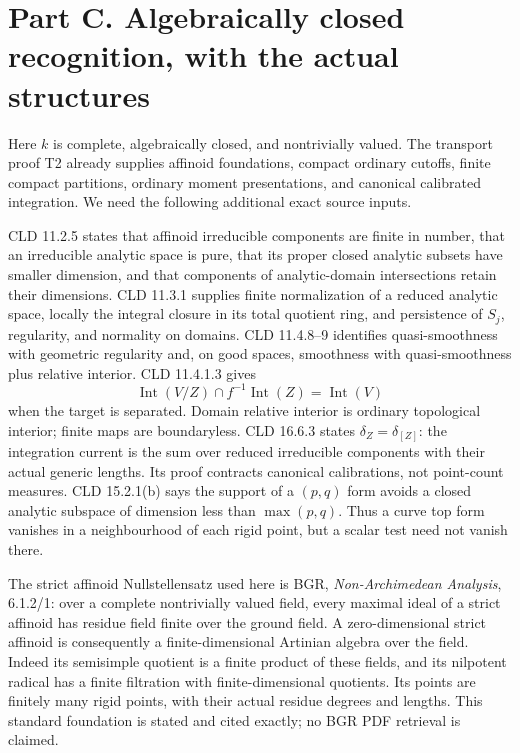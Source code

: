 \documentclass[
  10pt,
]{article}
\begin{document}
\section{Part C. Algebraically closed recognition, with the actual
structures}\label{part-c.-algebraically-closed-recognition-with-the-actual-structures}

Here \(k\) is complete, algebraically closed, and nontrivially valued.
The transport proof T2 already supplies affinoid foundations, compact
ordinary cutoffs, finite compact partitions, ordinary moment
presentations, and canonical calibrated integration. We need the
following additional exact source inputs.

CLD 11.2.5 states that affinoid irreducible components are finite in
number, that an irreducible analytic space is pure, that its proper
closed analytic subsets have smaller dimension, and that components of
analytic-domain intersections retain their dimensions. CLD 11.3.1
supplies finite normalization of a reduced analytic space, locally the
integral closure in its total quotient ring, and persistence of \(S_j\),
regularity, and normality on domains. CLD 11.4.8--9 identifies
quasi-smoothness with geometric regularity and, on good spaces,
smoothness with quasi-smoothness plus relative interior. CLD 11.4.1.3
gives \[
 \operatorname{Int}(V/Z)\cap f^{-1}\operatorname{Int}(Z)=\operatorname{Int}(V)
\] when the target is separated. Domain relative interior is ordinary
topological interior; finite maps are boundaryless. CLD 16.6.3 states
\(\delta_Z=\delta_{[Z]}\): the integration current is the sum over
reduced irreducible components with their actual generic lengths. Its
proof contracts canonical calibrations, not point-count measures. CLD
15.2.1(b) says the support of a \((p,q)\) form avoids a closed analytic
subspace of dimension less than \(\max(p,q)\). Thus a curve top form
vanishes in a neighbourhood of each rigid point, but a scalar test need
not vanish there.

The strict affinoid Nullstellensatz used here is BGR,
\emph{Non-Archimedean Analysis}, 6.1.2/1: over a complete nontrivially
valued field, every maximal ideal of a strict affinoid has residue field
finite over the ground field. A zero-dimensional strict affinoid is
consequently a finite-dimensional Artinian algebra over the field.
Indeed its semisimple quotient is a finite product of these fields, and
its nilpotent radical has a finite filtration with finite-dimensional
quotients. Its points are finitely many rigid points, with their actual
residue degrees and lengths. This standard foundation is stated and
cited exactly; no BGR PDF retrieval is claimed.
\end{document}
